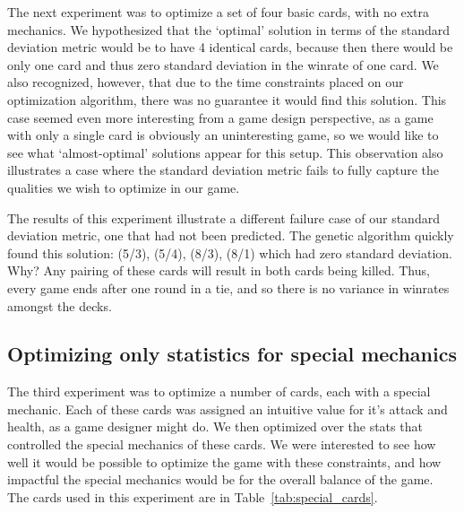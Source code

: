 The next experiment was to optimize a set of four basic cards, with no extra mechanics. We hypothesized that the `optimal' solution in terms of the standard deviation metric would be to have 4 identical cards, because then there would be only one card and thus zero standard deviation in the winrate of one card. We also recognized, however, that due to the time constraints placed on our optimization algorithm, there was no guarantee it would find this solution. This case seemed even more interesting from a game design perspective, as a game with only a single card is obviously an uninteresting game, so we would like to see what `almost-optimal' solutions appear for this setup. This observation also illustrates a case where the standard deviation metric fails to fully capture the qualities we wish to optimize in our game.

The results of this experiment illustrate a different failure case of our standard deviation metric, one that had not been predicted. The genetic algorithm quickly found this solution: (5/3), (5/4), (8/3), (8/1) which had zero standard deviation. Why? Any pairing of these cards will result in both cards being killed. Thus, every game ends after one round in a tie, and so there is no variance in winrates amongst the decks. 

 \subsection{Optimizing only statistics for special mechanics}

The third experiment was to optimize a number of cards, each with a special mechanic. Each of these cards was assigned an intuitive value for it's attack and health, as a game designer might do. We then optimized over the stats that controlled the special mechanics of these cards. We were interested to see how well it would be possible to optimize the game with these constraints, and how impactful the special mechanics would be for the overall balance of the game. The cards used in this experiment are in Table~\ref{tab:special_cards}.

